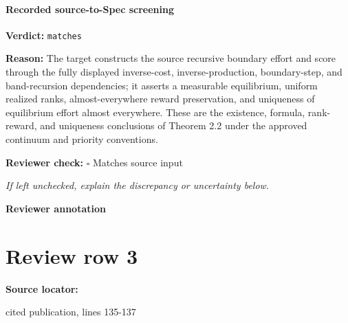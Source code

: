 \documentclass[10pt]{article}
\newcommand{\reviewerbox}{%
  \par\noindent\fbox{\parbox{0.96\linewidth}{\rule{0pt}{0.38in}}}\par
}
\newcommand{\reviewmatch}[1]{%
  \par\noindent\textbf{Reviewer check:} $\square$\; #1\par
  \noindent\emph{If left unchecked, explain the discrepancy or uncertainty below.}\par
}
\begin{document}
\paragraph{Recorded source-to-Spec screening}
\textbf{Verdict:} \texttt{matches}
\\
{\raggedright
\textbf{Reason:} The target constructs the source recursive boundary effort and score through the fully displayed inverse-\allowbreak{}cost, inverse-\allowbreak{}production, boundary-\allowbreak{}step, and band-\allowbreak{}recursion dependencies;\allowbreak{} it asserts a measurable equilibrium, uniform realized ranks, almost-\allowbreak{}everywhere reward preservation, and uniqueness of equilibrium effort almost everywhere.\allowbreak{} These are the existence, formula, rank-\allowbreak{}reward, and uniqueness conclusions of Theorem 2.\allowbreak{}2 under the approved continuum and priority conventions.\allowbreak{}
\par}
\reviewmatch{Matches source input}
\noindent\textbf{Reviewer annotation}\par
\reviewerbox
\clearpage
\hypertarget{source-claim-6f73613040867488}{}
\section*{Review row 3}
\textbf{Source locator:} {\footnotesize\raggedright cited publication, lines 135-\allowbreak{}137\par}
\end{document}
